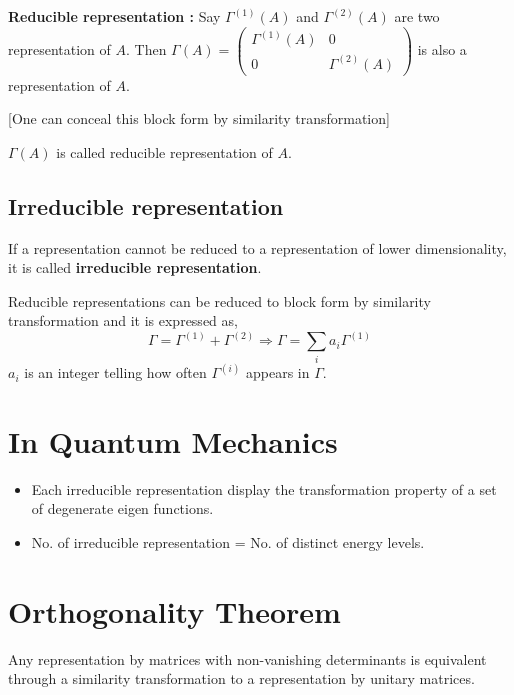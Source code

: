 \noindent
{\bf Reducible representation :} Say $\Gamma^{(1)}(A)$ and $\Gamma^{(2)}(A)$ are two representation of $A$. Then $\Gamma(A)=\left(\begin{smallmatrix} \Gamma^{(1)}(A) & 0\\ 0 & \Gamma^{(2)}(A)\end{smallmatrix}\right)$ is also a representation of $A$.

[One can conceal this block form by similarity transformation]

$\Gamma(A)$ is called reducible representation of $A$.

\subsection*{Irreducible representation}

If a representation cannot be reduced to a representation of lower dimensionality, it is called {\bf irreducible representation}.

Reducible representations can be reduced to block form by similarity transformation and it is expressed as,
$$
\Gamma=\Gamma^{(1)}+\Gamma^{(2)}\Rightarrow \Gamma=\sum\limits_{i}a_{i}\Gamma^{(1)}
$$
$a_{i}$ is an integer telling how often $\Gamma^{(i)}$ appears in $\Gamma$.

\eject

\section*{In Quantum Mechanics}
\begin{itemize}
\item Each irreducible representation display the transformation property of a set of degenerate eigen functions.

\item No. of irreducible representation = No. of distinct energy levels.
\end{itemize}

\section*{Orthogonality Theorem}

\begin{lemma*}
Any representation by matrices with non-vanishing determinants is equivalent through a similarity transformation to a representation by unitary matrices.
\end{lemma*}

